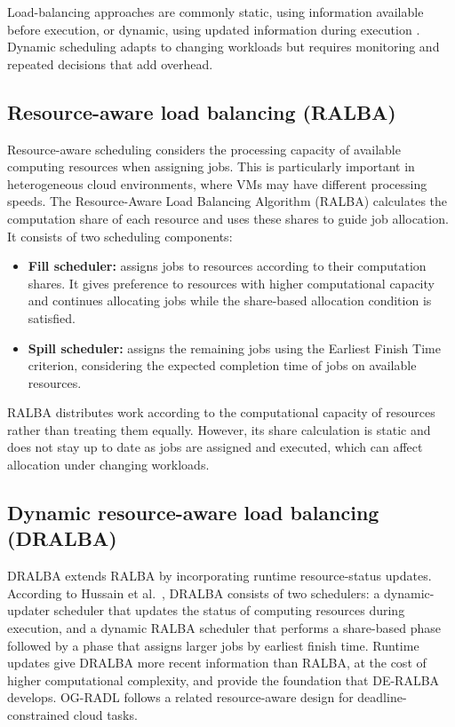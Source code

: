 \documentclass[default,sn-mathphys,Numbered]{sn-jnl}
\begin{document}
Load-balancing approaches are commonly static, using information available before execution, or dynamic, using updated information during execution \cite{shafiq2022review, arunarani2019task}. Dynamic scheduling adapts to changing workloads but requires monitoring and repeated decisions that add overhead.

\subsection{Resource-aware load balancing (RALBA)}
Resource-aware scheduling considers the processing capacity of available computing resources when assigning jobs. This is particularly important in heterogeneous cloud environments, where VMs may have different processing speeds. The Resource-Aware Load Balancing Algorithm (RALBA) \cite{hussain2018ralba} calculates the computation share of each resource and uses these shares to guide job allocation. It consists of two scheduling components:
\begin{itemize}
    \item \textbf{Fill scheduler:} assigns jobs to resources according to their computation shares. It gives preference to resources with higher computational capacity and continues allocating jobs while the share-based allocation condition is satisfied.
    \item \textbf{Spill scheduler:} assigns the remaining jobs using the Earliest Finish Time criterion, considering the expected completion time of jobs on available resources.
\end{itemize}
RALBA distributes work according to the computational capacity of resources rather than treating them equally. However, its share calculation is static and does not stay up to date as jobs are assigned and executed, which can affect allocation under changing workloads.

\subsection{Dynamic resource-aware load balancing (DRALBA)}
DRALBA \cite{nabi2021dralba} extends RALBA by incorporating runtime resource-status updates. According to Hussain et al.\ \cite{hussain2025deralba}, DRALBA consists of two schedulers: a dynamic-updater scheduler that updates the status of computing resources during execution, and a dynamic RALBA scheduler that performs a share-based phase followed by a phase that assigns larger jobs by earliest finish time. Runtime updates give DRALBA more recent information than RALBA, at the cost of higher computational complexity, and provide the foundation that DE-RALBA develops. OG-RADL \cite{nabi2021ogradl} follows a related resource-aware design for deadline-constrained cloud tasks.
\end{document}

